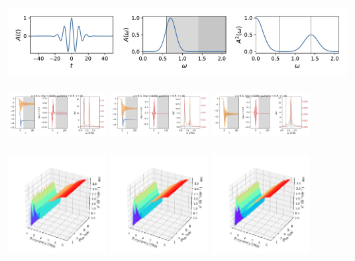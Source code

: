\documentclass[a4paper]{article}
\begin{document}
\begin{figure}[H]
  \centering
  \includegraphics[width=0.8\textwidth]{A2.pdf}
\end{figure}
\begin{figure}[H]
  \centering
  \includegraphics[width=0.23\textwidth]{HL-A2-v0-imp0.pdf}
  \includegraphics[width=0.23\textwidth]{HL-A2-v1-imp0.pdf}
  \includegraphics[width=0.23\textwidth]{HL-A2-v2-imp0.pdf}
\end{figure}
\begin{figure}[H]
  \centering
  \includegraphics[width=0.23\textwidth]{cond3d_real-A2-v0-imp0.pdf}
  \includegraphics[width=0.23\textwidth]{cond3d_real-A2-v1-imp0.pdf}
  \includegraphics[width=0.23\textwidth]{cond3d_real-A2-v2-imp0.pdf}
\end{figure}
\end{document}
